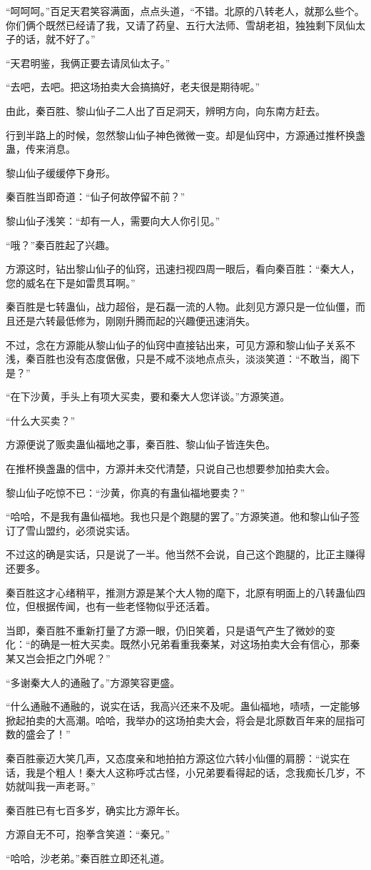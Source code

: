 \begin{this_body}
“呵呵呵。”百足天君笑容满面，点点头道，“不错。北原的八转老人，就那么些个。你们俩个既然已经请了我，又请了药皇、五行大法师、雪胡老祖，独独剩下凤仙太子的话，就不好了。”

“天君明鉴，我俩正要去请凤仙太子。”

“去吧，去吧。把这场拍卖大会搞搞好，老夫很是期待呢。”

由此，秦百胜、黎山仙子二人出了百足洞天，辨明方向，向东南方赶去。

行到半路上的时候，忽然黎山仙子神色微微一变。却是仙窍中，方源通过推杯换盏蛊，传来消息。

黎山仙子缓缓停下身形。

秦百胜当即奇道：“仙子何故停留不前？”

黎山仙子浅笑：“却有一人，需要向大人你引见。”

“哦？”秦百胜起了兴趣。

方源这时，钻出黎山仙子的仙窍，迅速扫视四周一眼后，看向秦百胜：“秦大人，您的威名在下是如雷贯耳啊。”

秦百胜是七转蛊仙，战力超俗，是石磊一流的人物。此刻见方源只是一位仙僵，而且还是六转最低修为，刚刚升腾而起的兴趣便迅速消失。

不过，念在方源能从黎山仙子的仙窍中直接钻出来，可见方源和黎山仙子关系不浅，秦百胜也没有态度倨傲，只是不咸不淡地点点头，淡淡笑道：“不敢当，阁下是？”

“在下沙黄，手头上有项大买卖，要和秦大人您详谈。”方源笑道。

“什么大买卖？”

方源便说了贩卖蛊仙福地之事，秦百胜、黎山仙子皆连失色。

在推杯换盏蛊的信中，方源并未交代清楚，只说自己也想要参加拍卖大会。

黎山仙子吃惊不已：“沙黄，你真的有蛊仙福地要卖？”

“哈哈，不是我有蛊仙福地。我也只是个跑腿的罢了。”方源笑道。他和黎山仙子签订了雪山盟约，必须说实话。

不过这的确是实话，只是说了一半。他当然不会说，自己这个跑腿的，比正主赚得还要多。

秦百胜这才心绪稍平，推测方源是某个大人物的麾下，北原有明面上的八转蛊仙四位，但根据传闻，也有一些老怪物似乎还活着。

当即，秦百胜不重新打量了方源一眼，仍旧笑着，只是语气产生了微妙的变化：“的确是一桩大买卖。既然小兄弟看重我秦某，对这场拍卖大会有信心，那秦某又岂会拒之门外呢？”

“多谢秦大人的通融了。”方源笑容更盛。

“什么通融不通融的，说实在话，我高兴还来不及呢。蛊仙福地，啧啧，一定能够掀起拍卖的大高潮。哈哈，我举办的这场拍卖大会，将会是北原数百年来的屈指可数的盛会了！”

秦百胜豪迈大笑几声，又态度亲和地拍拍方源这位六转小仙僵的肩膀：“说实在话，我是个粗人！秦大人这称呼忒古怪，小兄弟要看得起的话，念我痴长几岁，不妨就叫我一声老哥。”

秦百胜已有七百多岁，确实比方源年长。

方源自无不可，抱拳含笑道：“秦兄。”

“哈哈，沙老弟。”秦百胜立即还礼道。

\end{this_body}

